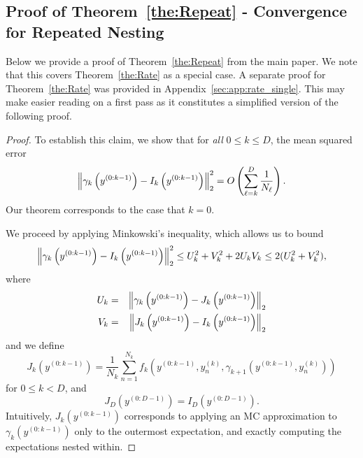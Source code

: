 
\subsection{Proof of Theorem~\ref{the:Repeat} - Convergence for Repeated Nesting}
\label{sec:app:repeat}

Below we provide a proof of Theorem~\ref{the:Repeat} from the main paper.  We note that this covers 
Theorem~\ref{the:Rate} as a special case.  A separate proof for Theorem~\ref{the:Rate} was provided in
Appendix~\ref{sec:app:rate_single}.  This may make easier reading on a first pass as 
it constitutes a simplified version of the following proof.

\theRepeat*

\begin{proof}
  To establish this claim, we show that for \emph{all} $0 \leq k \leq D$, the mean squared
  error
  \begin{equation} \label{eq:mse-rate-goal}
    \left\lVert\gamma_k\left(y^{(0:k-1)}\right) - I_k\left(y^{(0:k-1)}\right)\right\rVert^2_2
    = O\left(\sum_{\ell=k}^D \frac{1}{N_\ell}\right).
  \end{equation}
  Our theorem corresponds to the case that $k = 0$.
  
  We proceed by applying Minkowski's inequality, which allows us to bound
  \[
    \left\lVert\gamma_k\left(y^{(0:k-1)}\right) - I_k\left(y^{(0:k-1)}\right)\right\rVert_2^2
    \leq U_k^2 + V_k^2 + 2U_kV_k \leq 2(U_k^2 + V_k^2),
  \]
  where
  \begin{eqnarray*}
    U_k &=& \left\lVert\gamma_k\left(y^{(0:k-1)}\right) - J_k\left(y^{(0:k-1)}\right)\right\rVert_2 \\
    V_k &=& \left\lVert J_k\left(y^{(0:k-1)}\right) - I_k\left(y^{(0:k-1)}\right)\right\rVert_2
  \end{eqnarray*}
  and we define
  \[
    J_k\left(y^{(0:k-1)}\right) = \frac{1}{N_k} \sum_{n=1}^{N_k} f_k\left(y^{(0:k-1)}, y^{(k)}_n, \gamma_{k+1}\left(y^{(0:k-1)}, y^{(k)}_n\right)\right)
  \]
  for $0 \leq k < D$, and
  \[
    J_D\left(y^{(0:D-1)}\right) = I_D\left(y^{(0:D-1)}\right).
  \]
  Intuitively, $J_k\left(y^{(0:k-1)}\right)$ corresponds to applying an MC approximation
  to $\gamma_k\left(y^{(0:k-1)}\right)$ only to the outermost expectation, and exactly
  computing the expectations nested within.


\end{proof}
